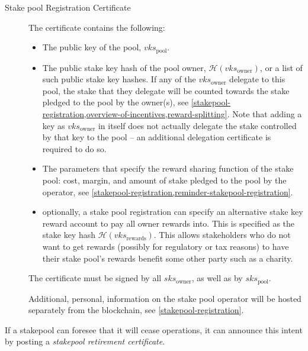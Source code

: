 \documentclass[11pt,a4paper]{article}
\begin{document}
\begin{description}
\item[Stake pool Registration Certificate]
The certificate contains the following:

\begin{itemize}
\item
  The public key of the pool, \(vks_\text{pool}\).
\item The public stake key hash of the pool owner,
  \(\mathcal{H}(vks_\text{owner})\),
  or a list of such public stake key hashes. If any of the
  \(vks_\text{owner}\)
  delegate to this pool, the stake that they delegate will be
  counted towards the stake pledged to the pool by the owner(s), see
  \cref{stakepool-registration,overview-of-incentives,reward-splitting}. Note
  that adding a key as \(vks_\text{owner}\)
  in itself does not actually delegate the stake controlled by that
  key to the pool -- an additional delegation certificate is required
  to do so.
\item
  The parameters that specify the reward sharing function of the stake
  pool: cost, margin, and amount of stake pledged to the pool by the
  operator, see \cref{stakepool-registration,reminder-stakepool-registration}.
\item
  optionally, a stake pool registration can specify an alternative stake
  key reward account to pay all owner rewards into. This is specified as
  the stake key hash \(\mathcal{H}(vks_\text{rewards})\). This allows
  stakeholders who do not want to get rewards (possibly for regulatory
  or tax reasons) to have their stake pool's rewards benefit some other
  party such as a charity.
\end{itemize}

The certificate must be signed by all \(sks_\text{owner}\), as well as
by \(sks_\text{pool}\).

Additional, personal, information on the stake pool operator will be
hosted separately from the blockchain, see \cref{stakepool-registration}.
\end{description}

If a stakepool can foresee that it will cease operations, it can
announce this intent by posting a \emph{stakepool retirement
certificate}.
\end{document}
